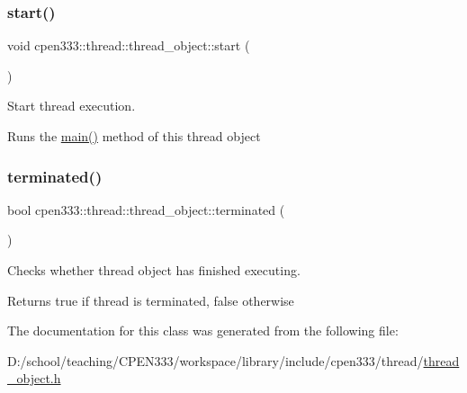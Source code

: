 \subsubsection{\texorpdfstring{start()}{start()}}
{\footnotesize\ttfamily void cpen333\+::thread\+::thread\+\_\+object\+::start (\begin{DoxyParamCaption}{ }\end{DoxyParamCaption})\hspace{0.3cm}{\ttfamily [inline]}}



Start thread execution. 

Runs the \hyperlink{classcpen333_1_1thread_1_1thread__object_adbd74f6f7461d90a1c12e8078aa5f3af}{main()} method of this thread object \mbox{\label{classcpen333_1_1thread_1_1thread__object_a3f7f0eb9632797cbd86dc4b84f38baed}} 
\subsubsection{\texorpdfstring{terminated()}{terminated()}}
{\footnotesize\ttfamily bool cpen333\+::thread\+::thread\+\_\+object\+::terminated (\begin{DoxyParamCaption}{ }\end{DoxyParamCaption})\hspace{0.3cm}{\ttfamily [inline]}}



Checks whether thread object has finished executing. 

\begin{DoxyReturn}{Returns}
true if thread is terminated, false otherwise 
\end{DoxyReturn}


The documentation for this class was generated from the following file\+:\begin{DoxyCompactItemize}
\item 
D\+:/school/teaching/\+C\+P\+E\+N333/workspace/library/include/cpen333/thread/\hyperlink{thread__object_8h}{thread\+\_\+object.\+h}\end{DoxyCompactItemize}
